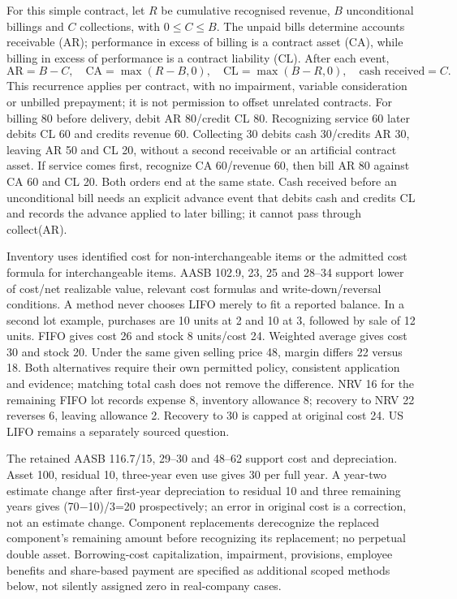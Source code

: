 For this simple contract, let $R$ be cumulative recognised revenue, $B$
unconditional billings and $C$ collections, with $0\leq C\leq B$. The unpaid
bills determine accounts receivable (AR); performance in excess of billing is
a contract asset (CA), while billing in excess of performance is a contract
liability (CL). After each event,
\[
 \mathrm{AR}=B-C,\quad \mathrm{CA}=\max(R-B,0),\quad
 \mathrm{CL}=\max(B-R,0),\quad \text{cash received}=C.
\]
This recurrence applies per contract, with no impairment, variable consideration or unbilled prepayment; it is not permission to offset unrelated contracts. For billing 80 before delivery, debit AR 80/credit CL 80. Recognizing service 60 later debits CL 60 and credits revenue 60. Collecting 30 debits cash 30/credits AR 30, leaving AR 50 and CL 20, without a second receivable or an artificial contract asset. If service comes first, recognize CA 60/revenue 60, then bill AR 80 against CA 60 and CL 20. Both orders end at the same state. Cash received before an unconditional bill needs an explicit advance event that debits cash and credits CL and records the advance applied to later billing; it cannot pass through collect(AR).

Inventory uses identified cost for non-interchangeable items or the admitted cost formula for interchangeable items. AASB 102.9, 23, 25 and 28--34 support lower of cost/net realizable value, relevant cost formulas and write-down/reversal conditions. A method never chooses LIFO merely to fit a reported balance. In a second lot example, purchases are 10 units at 2 and 10 at 3, followed by sale of 12 units. FIFO gives cost 26 and stock 8 units/cost 24. Weighted average gives cost 30 and stock 20. Under the same given selling price 48, margin differs 22 versus 18. Both alternatives require their own permitted policy, consistent application and evidence; matching total cash does not remove the difference. NRV 16 for the remaining FIFO lot records expense 8, inventory allowance 8; recovery to NRV 22 reverses 6, leaving allowance 2. Recovery to 30 is capped at original cost 24. US LIFO remains a separately sourced question.

The retained AASB 116.7/15, 29--30 and 48--62 support cost and depreciation. Asset 100, residual 10, three-year even use gives 30 per full year. A year-two estimate change after first-year depreciation to residual 10 and three remaining years gives (70\ensuremath{-}10)/3=20 prospectively; an error in original cost is a correction, not an estimate change. Component replacements derecognize the replaced component's remaining amount before recognizing its replacement; no perpetual double asset. Borrowing-cost capitalization, impairment, provisions, employee benefits and share-based payment are specified as additional scoped methods below, not silently assigned zero in real-company cases.

